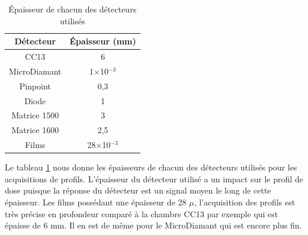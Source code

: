 \documentclass{book}
\begin{document}

\begin{table}
  \centering
  \begin{tabular}{cc}
    \toprule
    \textbf{Détecteur} & \textbf{Épaisseur (mm)} \\
    \toprule
    CC13 & 6 \\
    MicroDiamant & 1$\times$10$^{-3}$  \\
    Pinpoint & 0,3  \\
    Diode & 1  \\
    Matrice 1500 & 3 \\
    Matrice 1600 & 2,5 \\
    Films & 28$\times$10$^{-3}$ \\
    \bottomrule
  \end{tabular}
  \caption{Épaisseur de chacun des détecteurs utilisés}
  \label{table_epaisseurs_detecteurs}
\end{table}

Le tableau \ref*{table_epaisseurs_detecteurs} nous donne les épaisseurs de chacun des détecteurs utilisés pour les acquisitions de profils. L'épaisseur du détecteur utilisé a un impact sur le profil de dose puisque la réponse du détecteur est un signal moyen le long de cette épaisseur. Les films possédant une épaisseur de 28 $\mu$, l'acquisition des profils est très précise en profondeur comparé à la chambre CC13 par exemple qui est épaisse de 6 mm. Il en est de même pour le MicroDiamant qui est encore plus fin.
\end{document}
